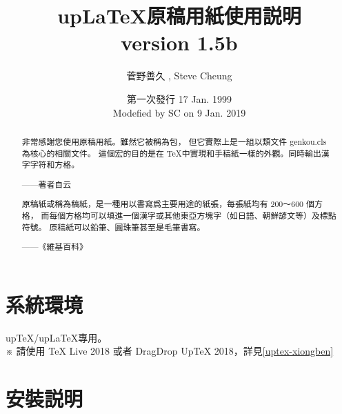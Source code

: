 \documentclass[a4,11pt,uplatex,openleft]{jsarticle}
\title{\Large \gtfamily up\LaTeX 原稿用紙使用説明\\ version 1.5b }
\author{\CID{8015}菅野善久  \footnotemark[1]   , \CID{8015}Steve Cheung \footnotemark[2]   }
\date{ \normalsize 第一次發行 17 Jan. 1999 \\ Modefied by SC on 9 Jan. 2019  }
\begin{document}
\mcfamily

\maketitle

\begin{abstract}
\doublespacing    \large
\par  非常感謝您使用原稿用紙。雖然它被稱為包，
但它實際上是一組以類文件 genkou.cls 為核心的相關文件。
這個宏的目的是在 \TeX 中實現和手稿紙一樣的外觀。同時輸出漢字字符和方格。
\par \hfill ——著者自云
\vspace{2 zw}
\par  原稿紙或稱為稿紙，是一種用以書寫爲主要用途的紙張，每張紙均有 200～600 個方格，
而每個方格均可以填進一個漢字或其他東亞方塊字（如日語、朝鮮諺文等）及標點符號。
原稿紙可以鉛筆、圓珠筆甚至是毛筆書寫。
\par \hfill ——《維基百科》
\end{abstract}
\clearpage
{  \singlespacing    \fontsize{12pt}{17pt}\selectfont
\tableofcontents }
\clearpage
\section{系統環境}
\par up\TeX/up\LaTeX 專用。\\
※ 請\hspace{3pt}使用 \TeX \hspace{3pt} Live 2018 或者 DragDrop Up\TeX
\hspace{3pt}  2018，詳見\ref{uptex-xiongben}

\section{安裝説明}
\end{document}
